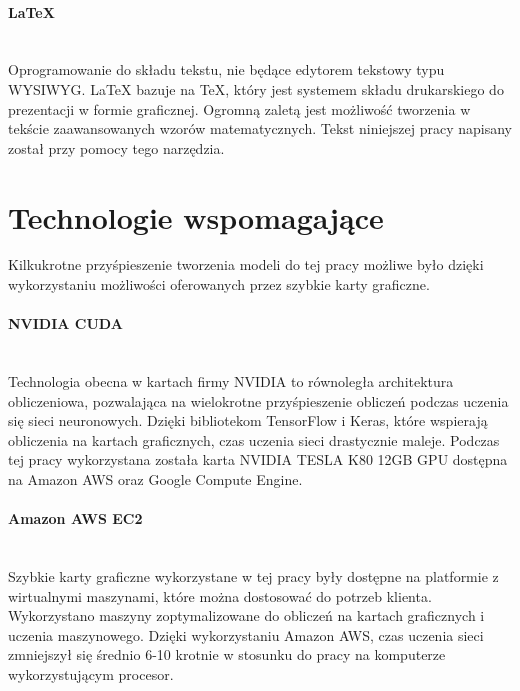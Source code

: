 \paragraph{LaTeX} \mbox{}\\
Oprogramowanie do składu tekstu, nie będące edytorem tekstowy typu WYSIWYG.
LaTeX bazuje na TeX, który jest systemem składu drukarskiego do prezentacji w
formie graficznej. Ogromną zaletą jest możliwość tworzenia w tekście zaawansowanych
wzorów matematycznych. Tekst niniejszej pracy napisany został przy pomocy tego narzędzia.

\section{Technologie wspomagające}
Kilkukrotne przyśpieszenie tworzenia modeli do tej pracy możliwe było dzięki wykorzystaniu
możliwości oferowanych przez szybkie karty graficzne.

\paragraph{NVIDIA CUDA} \mbox{}\\
Technologia obecna w kartach firmy NVIDIA to równoległa architektura obliczeniowa,
pozwalająca na wielokrotne przyśpieszenie obliczeń podczas uczenia się sieci neuronowych.
Dzięki bibliotekom TensorFlow i Keras, które wspierają obliczenia na kartach graficznych,
czas uczenia sieci drastycznie maleje. Podczas tej pracy wykorzystana została
karta NVIDIA TESLA K80 12GB GPU dostępna na Amazon AWS oraz Google Compute Engine.

\paragraph{Amazon AWS EC2} \mbox{}\\
Szybkie karty graficzne wykorzystane w tej pracy były dostępne na platformie z
wirtualnymi maszynami, które można dostosować do potrzeb klienta. Wykorzystano maszyny
zoptymalizowane do obliczeń na kartach graficznych i uczenia maszynowego.
Dzięki wykorzystaniu Amazon AWS, czas uczenia sieci zmniejszył się średnio 6-10 krotnie
w stosunku do pracy na komputerze wykorzystującym procesor.
